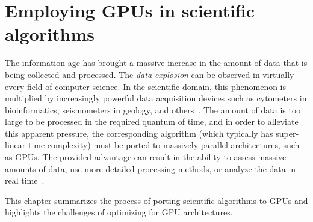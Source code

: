\chapter{Employing GPUs in scientific algorithms}
\label{chap:gpu}

The information age has brought a massive increase in the amount of data that is being collected and processed. The \emph{data explosion} can be observed in virtually every field of computer science. In the scientific domain, this phenomenon is multiplied by increasingly powerful data acquisition devices such as cytometers in bioinformatics, seismometers in geology, and others~\cite{brestoff2022contemporary,zhou2021high}. The amount of data is too large to be processed in the required quantum of time, and in order to alleviate this apparent pressure, the corresponding algorithm (which typically has super-linear time complexity) must be ported to massively parallel architectures, such as GPUs. The provided advantage can result in the ability to assess massive amounts of data, use more detailed processing methods, or analyze the data in real time~\cite{pratx2011gpu,navarro2014survey}.

This chapter summarizes the process of porting scientific algorithms to GPUs and highlights the challenges of optimizing for GPU architectures.







